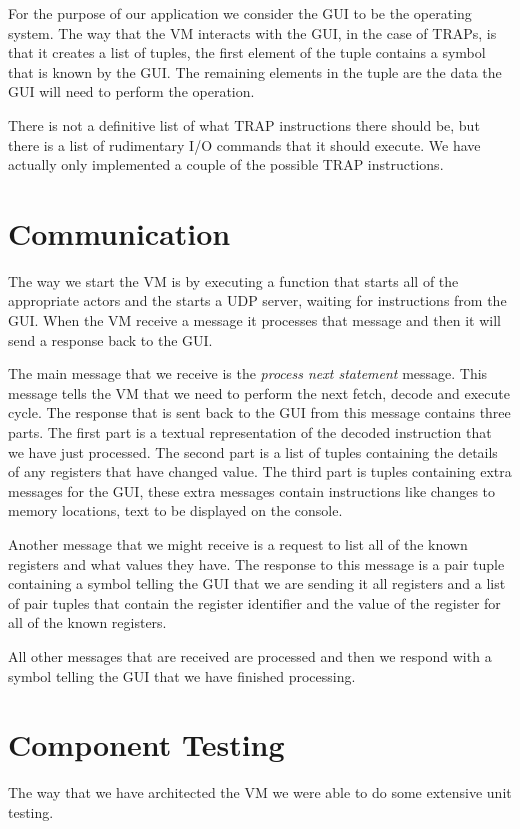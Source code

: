 \documentclass[a4paper,11pt]{report}
\begin{document}
For the purpose of our application we consider the GUI to be the operating system. The way that the VM interacts with the GUI, in the case of TRAPs, is that it creates a list of tuples, the first element of the tuple contains a symbol that is known by the GUI. The remaining elements in the tuple are the data the GUI will need to perform the operation.

There is not a definitive list of what TRAP instructions there should be, but there is a list of rudimentary I/O commands that it should execute. We have actually only implemented a couple of the possible TRAP instructions.
\section{Communication}
The way we start the VM is by executing a function that starts all of the appropriate actors and the starts a UDP server, waiting for instructions from the GUI. When the VM receive a message it processes that message and then it will send a response back to the GUI. 

The main message that we receive is the \textit{process next statement} message. This message tells the VM that we need to perform the next fetch, decode and execute cycle. The response that is sent back to the GUI from this message contains three parts. The first part is a textual representation of the decoded instruction that we have just processed. The second part is a list of tuples containing the details of any registers that have changed value. The third part is tuples containing extra messages for the GUI, these extra messages contain instructions like changes to memory locations, text to be displayed on the console.

Another message that we might receive is a request to list all of the known registers and what values they have. The response to this message is a pair tuple containing a symbol telling the GUI that we are sending it all registers and a list of pair tuples that contain the register identifier and the value of the register for all of the known registers.

All other messages that are received are processed and then we respond with a symbol telling the GUI that we have finished processing.
\section{Component Testing}
The way that we have architected the VM we were able to do some extensive unit testing.
\end{document}
